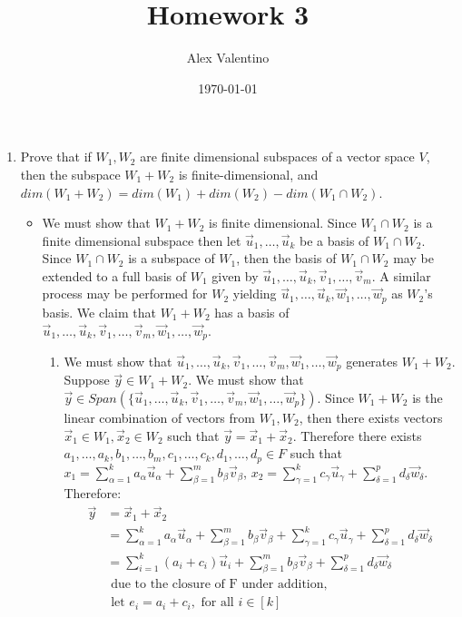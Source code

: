 \documentclass[12pt, letterpaper]{article}
\date{\today}
\author{Alex Valentino}
\title{Homework 3}
\begin{document}
	\begin{enumerate}
		\item  Prove that if $W_1, W_2$ are finite dimensional subspaces of a vector space $V$, then the subspace $W_1 + W_2$ is finite-dimensional, and $dim(W_1 + W_2) = dim(W_1) + dim(W_2) - dim(W_1 \cap W_2)$.
		\begin{itemize}
			\item We must show that $W_1 + W_2$ is finite dimensional.  Since $W_1 \cap W_2$ is a finite dimensional subspace then let $\Vec{u}_1, \ldots, \Vec{u}_k$ be a basis of $W_1 \cap W_2$.  Since $W_1 \cap W_2$ is a subspace of $W_1$, then the basis of $W_1 \cap W_2$ may be extended to a full basis of $W_1$ given by $\Vec{u}_1, \ldots, \Vec{u}_k, \Vec{v}_1,\ldots, \Vec{v}_m$.  A similar process may be performed for $W_2$ yielding $\Vec{u}_1, \ldots, \Vec{u}_k, \Vec{w}_1,\ldots, \Vec{w}_p$ as $W_2$'s basis.  We claim that $W_1 + W_2$ has a basis of $\Vec{u}_1, \ldots, \Vec{u}_k, \Vec{v}_1,\ldots, \Vec{v}_m, \Vec{w}_1,\ldots, \Vec{w}_p$.  
		\begin{enumerate}
		\item We must show that $\Vec{u}_1, \ldots, \Vec{u}_k, \Vec{v}_1,\ldots, \Vec{v}_m, \Vec{w}_1,\ldots, \Vec{w}_p$ generates $W_1 + W_2$.  Suppose $\Vec{y}  \in W_1 + W_2$.  We must show that $\Vec{y} \in Span(\{\Vec{u}_1, \ldots, \Vec{u}_k, \Vec{v}_1,\ldots, \Vec{v}_m, \Vec{w}_1,\ldots, \Vec{w}_p\})$. Since $W_1 + W_2$ is the linear combination of vectors from $W_1, W_2$, then there exists vectors $\Vec{x}_1 \in W_1, \Vec{x}_2 \in W_2$ such that $\Vec{y} = \Vec{x}_1 + \Vec{x}_2$.  Therefore there exists $a_1,\ldots, a_k, b_1, \ldots, b_m, c_1, \ldots, c_k, d_1,\ldots, d_p \in F$ such that $x_1 = \sum_{\alpha =1}^k a_\alpha \Vec{u}_\alpha + \sum_{\beta = 1}^m b_\beta \Vec{v}_\beta$, $x_2 = \sum_{\gamma =1}^k c_\gamma \Vec{u}_\gamma + \sum_{\delta = 1}^p d_\delta \Vec{w}_\delta$.  Therefore: 
		\begin{align*}
			\Vec{y} &= \Vec{x}_1 + \Vec{x}_2\\
			&= \sum_{\alpha =1}^k a_\alpha \Vec{u}_\alpha + \sum_{\beta = 1}^m b_\beta \Vec{v}_\beta + \sum_{\gamma =1}^k c_\gamma \Vec{u}_\gamma + \sum_{\delta = 1}^p d_\delta \Vec{w}_\delta \\
			&= \sum_{i=1}^k (a_i + c_i) \Vec{u}_i +  \sum_{\beta = 1}^m b_\beta \Vec{v}_\beta + \sum_{\delta = 1}^p d_\delta \Vec{w}_\delta\\
			&\text{ due to the closure of F under addition,}\\
			&\text{ let }	 e_i = a_i + c_i, \text{ for all } i \in [k]\\

\end{align*}
\end{enumerate}
\end{itemize}
\end{enumerate}
\end{document}
